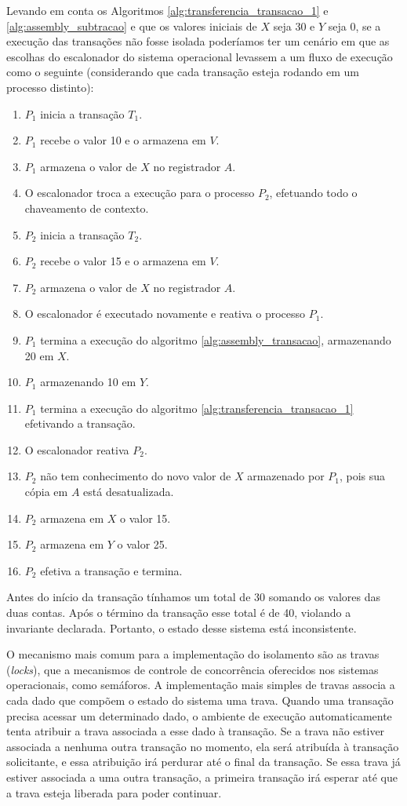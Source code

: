 \documentclass[11pt,twoside,a4paper]{book}
\begin{document}
Levando em conta os Algoritmos \ref{alg:transferencia_transacao_1} e \ref{alg:assembly_subtracao} e que os valores iniciais de $X$ seja 30 e $Y$ seja 0, se a execução das transações não fosse isolada poderíamos ter um cenário em que as escolhas do escalonador do sistema operacional levassem a um fluxo de execução como o seguinte (considerando que cada transação esteja rodando em um processo distinto):

\begin{enumerate}
	\item $P_1$ inicia a transação $T_1$.
	\item $P_1$ recebe o valor 10 e o armazena em $V$.
	\item $P_1$ armazena o valor de $X$ no registrador $A$.
	\item O escalonador troca a execução para o processo $P_2$, efetuando todo o chaveamento de contexto.
	\item $P_2$ inicia a transação $T_2$.
	\item $P_2$ recebe o valor 15 e o armazena em $V$.
	\item $P_2$ armazena o valor de $X$ no registrador $A$.
	\item O escalonador é executado novamente e reativa o processo $P_1$.
	\item $P_1$ termina a execução do algoritmo \ref{alg:assembly_transacao}, armazenando 20 em $X$.
	\item $P_1$ armazenando 10 em $Y$.
	\item $P_1$ termina a execução do algoritmo \ref{alg:transferencia_transacao_1} efetivando a transação.
	\item O escalonador reativa $P_2$.
	\item $P_2$ não tem conhecimento do novo valor de $X$ armazenado por $P_1$, pois sua cópia em $A$ está desatualizada.
	\item $P_2$ armazena em $X$ o valor 15.
	\item $P_2$ armazena em $Y$ o valor 25.
	\item $P_2$ efetiva a transação e termina.
\end{enumerate}

Antes do início da transação tínhamos um total de 30 somando os valores das duas contas. Após o término da transação esse total é de 40, violando a invariante declarada. Portanto, o estado desse sistema está inconsistente.

O mecanismo mais comum para a implementação do isolamento são as travas (\emph{locks}), que a mecanismos de controle de concorrência oferecidos nos sistemas operacionais, como semáforos. A implementação mais simples de travas associa a cada dado que compõem o estado do sistema uma trava. Quando uma transação precisa acessar um determinado dado, o ambiente de execução automaticamente tenta atribuir a trava associada a esse dado à transação. Se a trava não estiver associada a nenhuma outra transação no momento, ela será atribuída à transação solicitante, e essa atribuição irá perdurar até o final da transação. Se essa trava já estiver associada a uma outra transação, a primeira transação irá esperar até que a trava esteja liberada para poder continuar.
\end{document}
